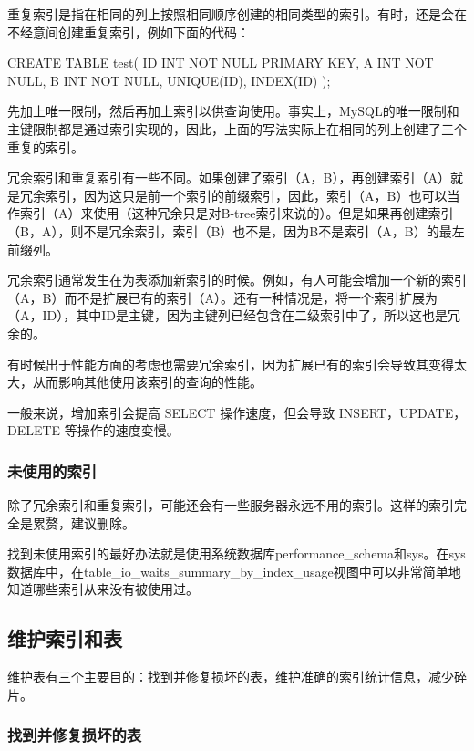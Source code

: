 重复索引是指在相同的列上按照相同顺序创建的相同类型的索引。有时，还是会在不经意间创建重复索引，例如下面的代码：

\begin{sql}
CREATE TABLE test(
    ID INT NOT NULL PRIMARY KEY,
    A INT NOT NULL,
    B INT NOT NULL,
    UNIQUE(ID),
    INDEX(ID)
);
\end{sql}

先加上唯一限制，然后再加上索引以供查询使用。事实上，MySQL的唯一限制和主键限制都是通过索引实现的，因此，上面的写法实际上在相同的列上创建了三个重复的索引。

冗余索引和重复索引有一些不同。如果创建了索引（A，B），再创建索引（A）就是冗余索引，因为这只是前一个索引的前缀索引，因此，索引（A，B）也可以当作索引（A）来使用（这种冗余只是对B-tree索引来说的）。但是如果再创建索引（B，A），则不是冗余索引，索引（B）也不是，因为B不是索引（A，B）的最左前缀列。

冗余索引通常发生在为表添加新索引的时候。例如，有人可能会增加一个新的索引（A，B）而不是扩展已有的索引（A）。还有一种情况是，将一个索引扩展为（A，ID），其中ID是主键，因为主键列已经包含在二级索引中了，所以这也是冗余的。

有时候出于性能方面的考虑也需要冗余索引，因为扩展已有的索引会导致其变得太大，从而影响其他使用该索引的查询的性能。

一般来说，增加索引会提高 SELECT 操作速度，但会导致 INSERT，UPDATE，DELETE 等操作的速度变慢。

\subsubsection{未使用的索引}

除了冗余索引和重复索引，可能还会有一些服务器永远不用的索引。这样的索引完全是累赘，建议删除。

找到未使用索引的最好办法就是使用系统数据库performance\_schema和sys。在sys数据库中，在table\_io\_waits\_summary\_by\_index\_usage视图中可以非常简单地知道哪些索引从来没有被使用过。

\subsection{维护索引和表}

维护表有三个主要目的：找到并修复损坏的表，维护准确的索引统计信息，减少碎片。

\subsubsection{找到并修复损坏的表}

